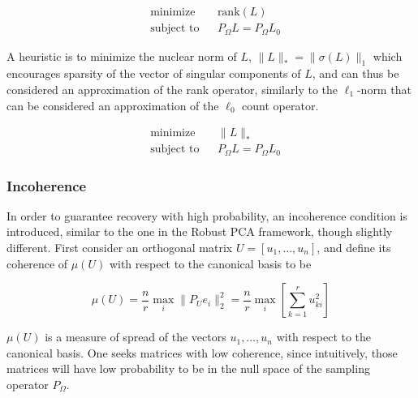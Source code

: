 \documentclass{../common/projectreport}
\begin{document}
\begin{equation}
\begin{aligned}
&\text{minimize} && \text{rank}(L) \\
&\text{subject to} && P_\Omega L = P_\Omega L_0
\end{aligned}
\end{equation}


A heuristic is to minimize the nuclear norm of $L$, $\|L\|_* = \|\sigma(L)\|_1$ which encourages sparsity of the vector of singular components of $L$, and can thus be considered an approximation of the rank operator, similarly to the $\ell_1$-norm that can be considered an approximation of the $\ell_0$ count operator.

\begin{equation}
\begin{aligned}
&\text{minimize} && \|L\|_* \\
&\text{subject to} && P_\Omega L = P_\Omega L_0
\end{aligned}
\end{equation}


\subsubsection{Incoherence}

In order to guarantee recovery with high probability, an incoherence condition is introduced, similar to the one in the Robust PCA framework, though slightly different. First consider an orthogonal matrix $U = [u_1, \dots, u_n]$, and define its coherence of $\mu(U)$ with respect to the canonical basis to be

\begin{equation}
\mu(U) = \frac{n}{r} \max_i \|P_U e_i\|_2^2 = \frac{n}{r} \max_i \left[ \sum_{k=1}^r u_{ki}^2 \right]
\label{emc_incoherence}
\end{equation}

$\mu(U)$ is a measure of spread of the vectors $u_1, \dots, u_n$ with respect to the canonical basis. One seeks matrices with low coherence, since intuitively, those matrices will have low probability to be in the null space of the sampling operator $P_\Omega$.
\end{document}
